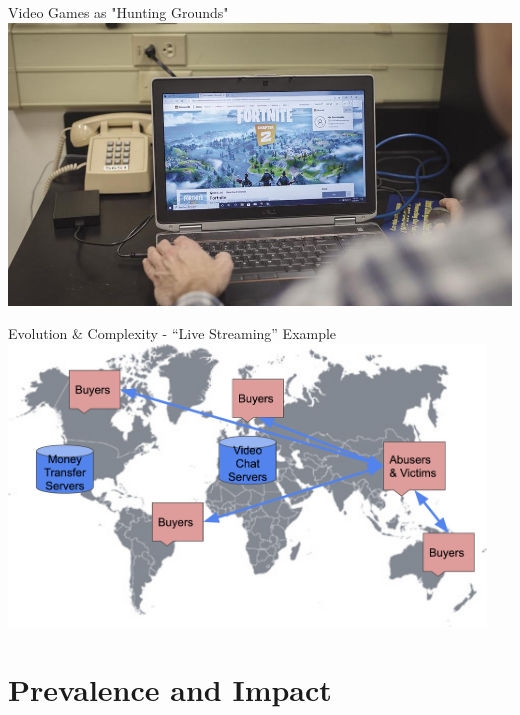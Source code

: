 \documentclass[nobackground,dvipsnames,table,aspectratio=169]{beamer}
\begin{document}
\begin{frame}{Video Games as "Hunting Grounds"}
    \includegraphics[width=\textwidth]{fortnite}
\end{frame}

\begin{frame}{Evolution \& Complexity - “Live Streaming” Example}
    \centering
    \includegraphics[width=0.95\textwidth]{complexity}
\end{frame}

\section{Prevalence and Impact}
\end{document}
